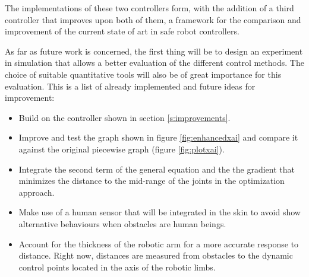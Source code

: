 The implementations of these two controllers form, with the addition of a third controller that improves upon both of them, a framework for the comparison and improvement of the current state of art in safe robot controllers.

As far as future work is concerned, the first thing will be to design an experiment in simulation that allows a better evaluation of the different control methods. The choice of suitable quantitative tools will also be of great importance for this evaluation. This is a list of already implemented and future ideas for improvement:

\begin{itemize}
    \item Build on the controller shown in section \ref{s:improvements}.
    \item Improve and test the graph shown in figure \ref{fig:enhancedxai} and compare it against the original piecewise graph (figure \ref{fig:plotxai}).
    \item Integrate the second term of the general equation and the the gradient that minimizes the distance to the mid-range of the joints in the optimization approach.
    \item Make use of a human sensor that will be integrated in the skin to avoid show alternative behaviours when obstacles are human beings.
    \item Account for the thickness of the robotic arm for a more accurate response to distance. Right now, distances are measured from obstacles to the dynamic control points located in the axis of the robotic limbs.
\end{itemize}
